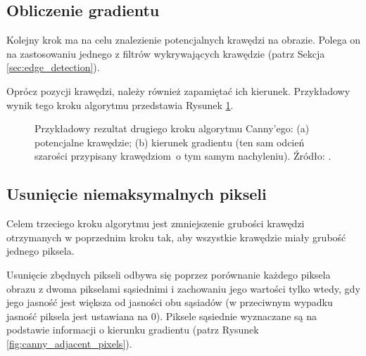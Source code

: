 \documentclass[a4paper,twocolumn,12pt]{article}
\begin{document}
\subsection{Obliczenie gradientu}

Kolejny krok ma na celu znalezienie potencjalnych krawędzi na obrazie.
Polega on na zastosowaniu jednego z filtrów wykrywających krawędzie (patrz Sekcja \ref{sec:edge_detection}).

Oprócz pozycji krawędzi, należy również zapamiętać ich kierunek.
Przykładowy wynik tego kroku algorytmu przedstawia Rysunek \ref{fig:canny_gradient}.

\begin{figure}[!ht]
 \begin{center}
 \end{center}
 \caption{
  Przykładowy rezultat drugiego kroku algorytmu Canny'ego:
  (a) potencjalne krawędzie;
  (b) kierunek gradientu (ten sam odcień szarości przypisany krawędziom~o tym samym nachyleniu).
  Źródło: \cite{boldak}.
 }
 \label{fig:canny_gradient}
\end{figure}


\subsection{Usunięcie niemaksymalnych pikseli}

Celem trzeciego kroku algorytmu jest zmniejszenie grubości krawędzi otrzymanych w poprzednim kroku tak, aby wszystkie krawędzie miały grubość jednego piksela.

Usunięcie zbędnych pikseli odbywa się poprzez porównanie każdego piksela obrazu z dwoma pikselami sąsiednimi i zachowaniu jego wartości tylko wtedy, gdy jego jasność jest większa od jasności obu sąsiadów (w przeciwnym wypadku jasność piksela jest ustawiana na 0).
Piksele sąsiednie wyznaczane są na podstawie informacji o kierunku gradientu (patrz Rysunek \ref{fig:canny_adjacent_pixels}).
\end{document}
